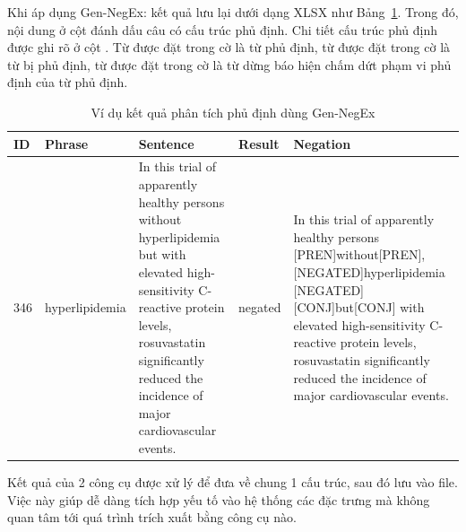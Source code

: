 Khi áp dụng Gen-NegEx: kết quả lưu lại dưới dạng XLSX như Bảng~\ref{table:Gen-NegEx}. Trong đó, nội dung  ở cột  đánh dấu câu có cấu trúc phủ định. Chi tiết cấu trúc phủ định được ghi rõ ở cột . Từ được đặt trong cờ \xquote{[PREN]} là từ phủ định, từ được đặt trong cờ \xquote{[NEGATED]} là từ bị phủ định, từ được đặt trong cờ \xquote{[CONJ]} là từ dừng báo hiện chấm dứt phạm vi phủ định của từ phủ định.\\

\begin{table}[H]
\centering
\caption{Ví dụ kết quả phân tích phủ định dùng Gen-NegEx}
\label{table:Gen-NegEx}
\begin{tabular}{|l|l|m{}|l|m{}|}
\hline
ID & Phrase & Sentence & Result & Negation \\ \hline
346 & hyperlipidemia & In this trial of apparently healthy persons without hyperlipidemia but with elevated high-sensitivity C-reactive protein levels, rosuvastatin significantly reduced the incidence of major cardiovascular events. & negated & In this trial of apparently healthy persons {[}PREN{]}without{[}PREN{]}, {[}NEGATED{]}hyperlipidemia {[}NEGATED{]} {[}CONJ{]}but{[}CONJ{]} with elevated high-sensitivity C-reactive protein levels, rosuvastatin significantly reduced the incidence of major cardiovascular events. \\ \hline
\end{tabular}
\end{table}


Kết quả của 2 công cụ được xử lý để đưa về chung 1 cấu trúc, sau đó lưu vào file. Việc này giúp dễ dàng tích hợp yếu tố vào hệ thống các đặc trưng mà không quan tâm tới quá trình trích xuất bằng công cụ nào.\\


